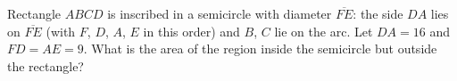 Rectangle $ABCD$ is inscribed in a semicircle with diameter $\overline{FE}$: the side $DA$ lies on $\overline{FE}$ (with $F$, $D$, $A$, $E$ in this order) and $B$, $C$ lie on the arc. Let $DA=16$ and $FD=AE=9$. What is the area of the region inside the semicircle but outside the rectangle?
